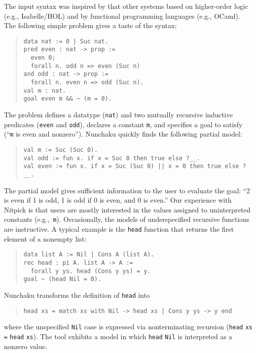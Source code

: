 The input syntax was inspired by that other systems based on higher-order
logic (e.g., Isabelle/HOL) and by functional programming languages (e.g.,
OCaml). The following simple problem gives a taste of the syntax:
%
\begin{quote}
\verb$data nat := 0 | Suc nat.$ \\[2\jot]
\verb$pred even : nat -> prop :=$ \\
\verb$  even 0;$ \\
\verb$  forall n. odd n => even (Suc n)$ \\
\verb$and odd : nat -> prop :=$ \\
\verb$  forall n. even n => odd (Suc n).$ \\[2\jot]
\verb$val m : nat.$ \\
\verb$goal even m && ~ (m = 0).$
\end{quote}
%
The problem defines a datatype (\texttt{nat}) and two mutually recursive
inductive predicates (\texttt{even} and \texttt{odd}), declares a constant
\texttt{m}, and specifies a goal to satisfy (``\texttt{m} is even and nonzero'').
Nunchaku quickly finds the following partial model:
%
\begin{quote}
\verb$val m := Suc (Suc 0).$ \\
\verb$val odd := fun x. if x = Suc 0 then true else ?__.$ \\
\verb$val even := fun x. if x = Suc (Suc 0) || x = 0 then true else ?__.$\kern-200mm
\end{quote}
%
The partial model gives sufficient information to the user to evaluate the
goal: ``2 is even if 1 is odd, 1 is odd if 0 is even, and 0 is even.''
Our experience with Nitpick
is that users are mostly interested in the values assigned to uninterpreted
constants (e.g.,~\texttt{m}). Occasionally, the models of underspecified
recursive functions are instructive. A typical example is
the \texttt{head} function that returns the first element of a nonempty list:
%
\begin{quote}
\verb$data list A := Nil | Cons A (list A).$ \\[2\jot]
\verb$rec head : pi A. list A -> A :=$ \\
\verb$  forall y ys. head (Cons y ys) = y.$ \\[2\jot]
\verb$goal ~ (head Nil = 0).$
\end{quote}
%
Nunchaku transforms the definition of \verb$head$ into
%
\begin{quote}
\verb$head xs = match xs with Nil -> head xs | Cons y ys -> y end$
\end{quote}
%
where the unspecified \verb$Nil$ case is expressed via nonterminating
recursion (\verb$head$ \verb$xs$ \verb$=$ \verb$head$ \verb$xs$).
The tool exhibits a model in which \verb$head$ \verb$Nil$ is interpreted as
a nonzero value.

